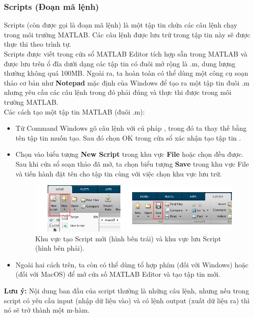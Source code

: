 \documentclass[12pt,a4paper]{article}
\begin{document}
\subsubsection{Scripts (Đoạn mã lệnh)}
Scripts (còn được gọi là đoạn mã lệnh) là một tập tin chứa các câu lệnh chạy trong môi trường MATLAB. Các câu lệnh được lưu trữ trong tập tin này sẽ được thực thi theo trình tự.\\
Scripts được viết trong cửa sổ MATLAB Editor tích hợp sẵn trong MATLAB và được lưu trên ổ đĩa dưới dạng các tập tin có đuôi mở rộng là .m, dung lượng thường không quá 100MB. Ngoài ra, ta hoàn toàn có thể dùng một công cụ soạn thảo cơ bản như \textbf{Notepad} mặc định của Windows để tạo ra một tập tin đuôi .m nhưng yêu cầu các câu lệnh trong đó phải đúng và thực thi được trong môi trường MATLAB.\\
Các cách tạo một tập tin MATLAB (đuôi .m):
\begin{itemize}
	\item Từ Command Windows gõ câu lệnh với cú pháp , trong đó ta thay thế  bằng tên tập tin muốn tạo. Sau đó chọn OK trong cửa sổ xác nhận tạo tập tin .
	\item Chọn vào biểu tượng \textbf{New Script} trong khu vực \textbf{File} hoặc chọn  đều được. Sau khi cửa sổ soạn thảo đã mở, ta chọn biểu tượng \textbf{Save} trong khu vực File và tiến hành đặt tên cho tập tin cùng với việc chọn khu vực lưu trữ.
\begin{center}
	\begin{figure}[htp]
		\begin{center}
		\includegraphics[scale=.5]{hinhtieuluan/pic5}
		\end{center}
		\caption{Khu vực tạo Script mới (hình bên trái) và khu vực lưu Script (hình bên phải).}
		\label{refhinh5}
	\end{figure}
\end{center}
	\item Ngoài hai cách trên, ta còn có thể dùng tổ hợp phím  (đối với Windows) hoặc  (đối với MacOS) để mở cửa số MATLAB Editor và tạo tập tin mới.
\end{itemize}
\textbf{Lưu ý:} Nội dung ban đầu của script thường là những câu lệnh, nhưng nếu trong script có yêu cầu input (nhập dữ liệu vào) và có lệnh output (xuất dữ liệu ra) thì nó sẽ trở thành một m-hàm. 
\end{document}
